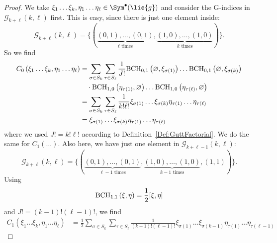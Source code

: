 \begin{proof}
	We take $\xi_1 \ldots \xi_k, \eta_1 \ldots \eta_{\ell} \in \Sym^{\bullet}
	(\lie{g})$ and consider the 	G-indices in $\mathcal{G}_{k + \ell}(k, \ell)$ 
	first. This is easy, since there is just one element inside:
	\begin{equation*}
		\mathcal{G}_{k + \ell}(k, \ell)
		=
		\Big\{
			( 
				\underbrace{(0,1), \ldots, (0,1)}_{
				\ell \text{ times}
				}
				,
				\underbrace{(1,0), \ldots, (1,0)}_{
				k \text{ times}
				}
			)
		\Big\}.
	\end{equation*}
	So we find
	\begin{align*}
		C_0 
		\left(
			\xi_1 \ldots \xi_k, \eta_1 \ldots \eta_{\ell}
		\right)
		& =
		\sum\limits_{\sigma \in S_k}
		\sum\limits_{\tau \in S_{\ell}}
		\frac{1}{J!}
		\mathrm{BCH}_{0, 1}\left(\varnothing, \xi_{\sigma(1)}\right)
		\ldots
		\mathrm{BCH}_{0, 1}\left(\varnothing, \xi_{\sigma(k)}\right)
		\\
		& \quad \cdot
		\mathrm{BCH}_{1, 0}\left(\eta_{\tau(1)}, \varnothing\right)
		\ldots
		\mathrm{BCH}_{1, 0}\left(\eta_{\tau(\ell)}, \varnothing\right)
		\\
		& =
		\sum\limits_{\sigma \in S_k}
		\sum\limits_{\tau \in S_{\ell}}
		\frac{1}{k! \ell!}
		\xi_{\sigma(1)} \ldots \xi_{\sigma(k)}
		\eta_{\tau(1)} \ldots \eta_{\tau(\ell)}
		\\
		& =
		\xi_{\sigma(1)} \ldots \xi_{\sigma(k)}
		\eta_{\tau(1)} \ldots \eta_{\tau(\ell)}
	\end{align*}
	where we used $J! = k! \ell!$  according to 
	Definition~\ref{Def:GuttFactorial}. We do the same for $C_1(\ldots)$. Also 
	here, we have just one element in $\mathcal{G}_{k + \ell - 1}(k, \ell)$:
		\begin{equation*}
		\mathcal{G}_{k + \ell}(k, \ell)
		=
		\Big\{
			( 
				\underbrace{(0,1), \ldots, (0,1)}_{
				\ell-1 \text{ times}
				}
				,
				\underbrace{(1,0), \ldots, (1,0)}_{
				k-1 \text{ times}
				}
				,
				(1,1)
			)
		\Big\}.
	\end{equation*}
	Using
	\begin{equation*}
		\mathrm{BCH}_{1, 1}\left(\xi, \eta\right)
		=
		\frac{1}{2} [\xi, \eta]
	\end{equation*}
	and $J! = (k - 1)! (\ell - 1)!$, we find
	\begin{align*}
		C_1 
		\left(
			\xi_1 \ldots \xi_k, \eta_1 \ldots \eta_{\ell}
		\right)
		& =
		\frac{1}{2}
		\sum\limits_{\sigma \in S_k}
		\sum\limits_{\tau \in S_{\ell}}
		\frac{1}{(k-1)! (\ell-1)!}
		\xi_{\sigma(1)} \ldots \xi_{\sigma(k-1)}
		\eta_{\tau(1)} \ldots \eta_{\tau(\ell-1)}

\end{align*}
\end{proof}
